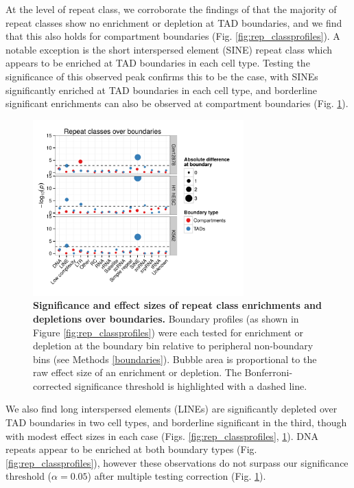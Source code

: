 \documentclass[a4paper,11pt,oneside]{book}
\begin{document}
At the level of repeat class, we corroborate the findings of \citet{Dixon2012} that the majority of repeat classes show no enrichment or depletion at TAD boundaries, and we find that this also holds for compartment boundaries (Fig. \ref{fig:rep_classprofiles}). A notable exception is the short interspersed element (SINE) repeat class which appears to be enriched at TAD boundaries in each cell type. Testing the significance of this observed peak confirms this to be the case, with SINEs significantly enriched at TAD boundaries in each cell type, and borderline significant enrichments can also be observed at compartment boundaries (Fig. \ref{fig:rep_classbubble}).

\begin{figure}
\begin{center} 
\includegraphics[width=3.2in]{rep_classbubble.pdf}
\captionsetup{width=\textwidth}
\caption[Significance and effect sizes of repeat class enrichments and depletions over boundaries.]{ {\bf Significance and effect sizes of repeat class enrichments and depletions over boundaries.}
Boundary profiles (as shown in Figure \ref{fig:rep_classprofiles}) were each tested for enrichment or depletion at the boundary bin relative to peripheral non-boundary bins (see Methods \ref{boundaries}). Bubble area is proportional to the raw effect size of an enrichment or depletion. The Bonferroni-corrected significance threshold is highlighted with a dashed line.
}\label{fig:rep_classbubble}
\end{center}
\end{figure} 

We also find long interspersed elements (LINEs) are significantly depleted over TAD boundaries in two cell types, and borderline significant in the third, though with modest effect sizes in each case (Figs. \ref{fig:rep_classprofiles}, \ref{fig:rep_classbubble}). DNA repeats appear to be enriched at both boundary types (Fig. \ref{fig:rep_classprofiles}), however these observations do not surpass our significance threshold ($\alpha = 0.05$) after multiple testing correction (Fig. \ref{fig:rep_classbubble}).
\end{document}

